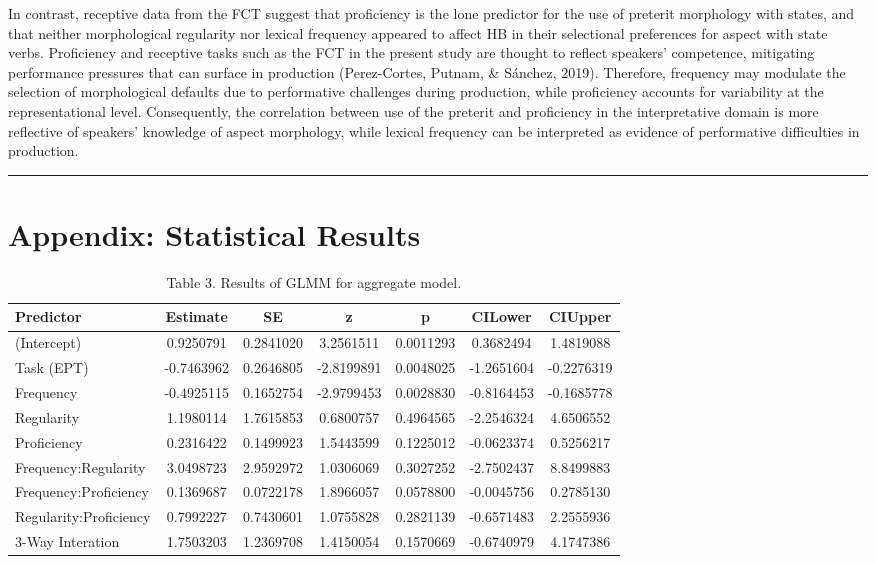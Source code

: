 \documentclass[
  english,
  man,floatsintext]{apa6}
\begin{document}
In contrast, receptive data from the FCT suggest that proficiency is the lone predictor for the use of preterit morphology with states, and that neither morphological regularity nor lexical frequency appeared to affect HB in their selectional preferences for aspect with state verbs. Proficiency and receptive tasks such as the FCT in the present study are thought to reflect speakers' competence, mitigating performance pressures that can surface in production (Perez-Cortes, Putnam, \& Sánchez, 2019). Therefore, frequency may modulate the selection of morphological defaults due to performative challenges during production, while proficiency accounts for variability at the representational level. Consequently, the correlation between use of the preterit and proficiency in the interpretative domain is more reflective of speakers' knowledge of aspect morphology, while lexical frequency can be interpreted as evidence of performative difficulties in production.

\begin{center}\rule{0.5\linewidth}{0.5pt}\end{center}

\hypertarget{appendix-statistical-results}{%
\section{Appendix: Statistical Results}\label{appendix-statistical-results}}

\begin{table}

\caption{\label{tab:table-for-aggregate}Table 3. Results of GLMM for aggregate model.}
\centering
\begin{tabular}[t]{l|c|c|c|c|c|c}
\hline
Predictor & Estimate & SE & z & p & CILower & CIUpper\\
\hline
(Intercept) & 0.9250791 & 0.2841020 & 3.2561511 & 0.0011293 & 0.3682494 & 1.4819088\\
\hline
Task (EPT) & -0.7463962 & 0.2646805 & -2.8199891 & 0.0048025 & -1.2651604 & -0.2276319\\
\hline
Frequency & -0.4925115 & 0.1652754 & -2.9799453 & 0.0028830 & -0.8164453 & -0.1685778\\
\hline
Regularity & 1.1980114 & 1.7615853 & 0.6800757 & 0.4964565 & -2.2546324 & 4.6506552\\
\hline
Proficiency & 0.2316422 & 0.1499923 & 1.5443599 & 0.1225012 & -0.0623374 & 0.5256217\\
\hline
Frequency:Regularity & 3.0498723 & 2.9592972 & 1.0306069 & 0.3027252 & -2.7502437 & 8.8499883\\
\hline
Frequency:Proficiency & 0.1369687 & 0.0722178 & 1.8966057 & 0.0578800 & -0.0045756 & 0.2785130\\
\hline
Regularity:Proficiency & 0.7992227 & 0.7430601 & 1.0755828 & 0.2821139 & -0.6571483 & 2.2555936\\
\hline
3-Way Interation & 1.7503203 & 1.2369708 & 1.4150054 & 0.1570669 & -0.6740979 & 4.1747386\\
\hline
\end{tabular}
\end{table}
\end{document}
